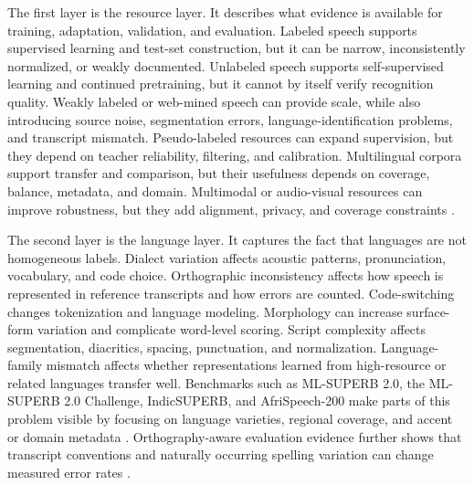 \documentclass[pdflatex,sn-basic,iicol]{sn-jnl}
\theoremstyle{thmstyleone}
\theoremstyle{thmstyletwo}
\theoremstyle{thmstylethree}
\begin{document}
The first layer is the resource layer. It describes what evidence is available for training, adaptation, validation, and evaluation. Labeled speech supports supervised learning and test-set construction, but it can be narrow, inconsistently normalized, or weakly documented. Unlabeled speech supports self-supervised learning and continued pretraining, but it cannot by itself verify recognition quality. Weakly labeled or web-mined speech can provide scale, while also introducing source noise, segmentation errors, language-identification problems, and transcript mismatch. Pseudo-labeled resources can expand supervision, but they depend on teacher reliability, filtering, and calibration. Multilingual corpora support transfer and comparison, but their usefulness depends on coverage, balance, metadata, and domain. Multimodal or audio-visual resources can improve robustness, but they add alignment, privacy, and coverage constraints \citep{ardila2020commonvoice,wang2021voxpopuli,pratap20_interspeech,lau2025_data_quality_multilingual_speech}.

The second layer is the language layer. It captures the fact that languages are not homogeneous labels. Dialect variation affects acoustic patterns, pronunciation, vocabulary, and code choice. Orthographic inconsistency affects how speech is represented in reference transcripts and how errors are counted. Code-switching changes tokenization and language modeling. Morphology can increase surface-form variation and complicate word-level scoring. Script complexity affects segmentation, diacritics, spacing, punctuation, and normalization. Language-family mismatch affects whether representations learned from high-resource or related languages transfer well. Benchmarks such as ML-SUPERB 2.0, the ML-SUPERB 2.0 Challenge, IndicSUPERB, and AfriSpeech-200 make parts of this problem visible by focusing on language varieties, regional coverage, and accent or domain metadata \citep{shi2024mlsuperb2,chen2025mlsuperb2challenge,javed2023indsuperb,olatunji2023_afrispeech200}. Orthography-aware evaluation evidence further shows that transcript conventions and naturally occurring spelling variation can change measured error rates \citep{karita2023lenient}.
\end{document}

